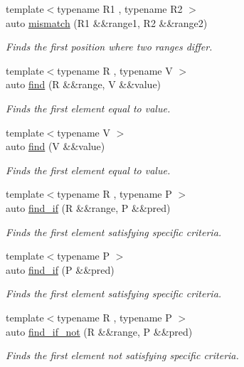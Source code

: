 \begin{DoxyCompactItemize}
{\footnotesize template$<$typename R1 , typename R2 $>$ }\\auto \mbox{\hyperlink{namespacerah_a5ce2d92c6f0b3dd5eb6d70600e949a97}{mismatch}} (R1 \&\&range1, R2 \&\&range2)
\begin{DoxyCompactList}\small\item\em Finds the first position where two ranges differ. \end{DoxyCompactList}\item 
{\footnotesize template$<$typename R , typename V $>$ }\\auto \mbox{\hyperlink{namespacerah_a7c7d4f08068e85923f475a069c3daeb7}{find}} (R \&\&range, V \&\&value)
\begin{DoxyCompactList}\small\item\em Finds the first element equal to value. \end{DoxyCompactList}\item 
{\footnotesize template$<$typename V $>$ }\\auto \mbox{\hyperlink{namespacerah_a37f60e134164914703fdd0508f83ee11}{find}} (V \&\&value)
\begin{DoxyCompactList}\small\item\em Finds the first element equal to value. \end{DoxyCompactList}\item 
{\footnotesize template$<$typename R , typename P $>$ }\\auto \mbox{\hyperlink{namespacerah_acbd71a185a2510e691dcd715a31edf53}{find\+\_\+if}} (R \&\&range, P \&\&pred)
\begin{DoxyCompactList}\small\item\em Finds the first element satisfying specific criteria. \end{DoxyCompactList}\item 
{\footnotesize template$<$typename P $>$ }\\auto \mbox{\hyperlink{namespacerah_a04200b08ecdef8daf99f04c58f29e459}{find\+\_\+if}} (P \&\&pred)
\begin{DoxyCompactList}\small\item\em Finds the first element satisfying specific criteria. \end{DoxyCompactList}\item 
{\footnotesize template$<$typename R , typename P $>$ }\\auto \mbox{\hyperlink{namespacerah_af758ef3c67d20ba6260319cb0e0171c5}{find\+\_\+if\+\_\+not}} (R \&\&range, P \&\&pred)
\begin{DoxyCompactList}\small\item\em Finds the first element not satisfying specific criteria. \end{DoxyCompactList}\item 

\end{DoxyCompactItemize}

